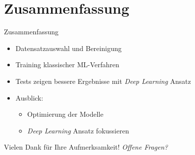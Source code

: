 \documentclass[aspectratio=169]{beamer} %
\begin{document}
\section{Zusammenfassung}

\begin{frame}{Zusammenfassung}
  \Large
  \begin{itemize}
      \item Datensatzauswahl und Bereinigung
      \item Training klassischer ML-Verfahren
      \item Tests zeigen bessere Ergebnisse mit \textit{Deep Learning} Ansatz
      \item Ausblick:
      \begin{itemize}
          \item Optimierung der Modelle
          \item \textit{Deep Learning} Ansatz fokussieren
      \end{itemize}
  \end{itemize}

  \vspace{1cm}
  \Large
  \pause Vielen Dank für Ihre Aufmerksamkeit!
  \vspace{0.5cm}
  \textit{Offene Fragen?}
\end{frame}
\end{document}
